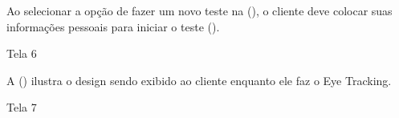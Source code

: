 Ao selecionar a opção de fazer um novo teste na (), o cliente deve colocar suas informações pessoais para iniciar o teste (). 

\begin{photograph}[H]
    \centering
    \caption{Tela 6}%
    \label{phot:pg-tela6}
    \end{photograph}

A () ilustra o design sendo exibido ao cliente enquanto ele faz o Eye Tracking. 

\begin{photograph}[H]
    \centering
    \caption{Tela 7}%
    \label{phot:pg-tela7}
    \end{photograph}

